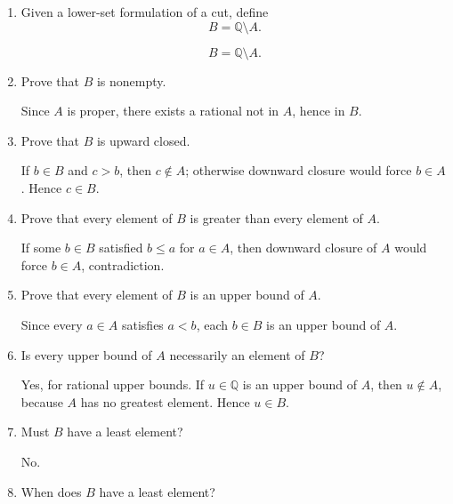 \documentclass{self-check}
\begin{document}
\begin{enumerate}[label=\arabic{*}., itemsep=10pt]
  \item Given a lower-set formulation of a cut, define
    \[ B=\mathbb{Q}\setminus A. \]

    \begin{answer}
      \[ B=\mathbb{Q}\setminus A. \]
    \end{answer}
  \item Prove that \(B\) is nonempty.

    \begin{answer}
      Since \(A\) is proper, there exists a rational not in \(A\), hence in \(B\).
    \end{answer}
  \item Prove that \(B\) is upward closed.

    \begin{answer}
      If \(b\in B\) and \(c>b\), then \(c\notin A\); otherwise downward closure would force \(b\in A\). Hence \(c\in B\).
    \end{answer}
  \item Prove that every element of \(B\) is greater than every element of \(A\).

    \begin{answer}
      If some \(b\in B\) satisfied \(b\le a\) for \(a\in A\), then downward closure of \(A\) would force \(b\in A\), contradiction.
    \end{answer}
  \item Prove that every element of \(B\) is an upper bound of \(A\).

    \begin{answer}
      Since every \(a\in A\) satisfies \(a<b\), each \(b\in B\) is an upper bound of \(A\).
    \end{answer}
  \item Is every upper bound of \(A\) necessarily an element of \(B\)?

    \begin{answer}
      Yes, for rational upper bounds. If \(u\in\mathbb{Q}\) is an upper bound of \(A\), then \(u\notin A\), because \(A\) has no greatest element. Hence \(u\in B\).
    \end{answer}
  \item Must \(B\) have a least element?

    \begin{answer}
      No.
    \end{answer}
  \item When does \(B\) have a least element?


\end{enumerate}
\end{document}
